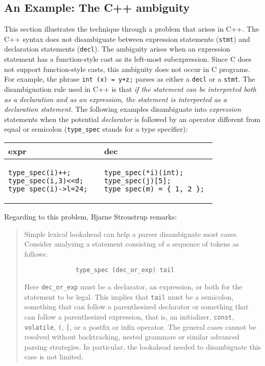 \label{section:amb}

\subsection{An Example: The C++ ambiguity}
This section illustrates the technique through a problem 
that arises in C++.
The C++ syntax \cite{c++} does not disambiguate between expression
statements (\verb|stmt|) and declaration statements (\verb|decl|). 
The ambiguity arises when an expression
statement has a function-style cast as its left-most subexpression.
Since C \cite{c} does not support function-style casts, this ambiguity does not occur
in C programs.
For example, the phrase \verb|int (x) = y+z;| 
parses as either a \texttt{decl} or a \texttt{stmt}.
The disambiguation rule used in C++ is that {\it
if the statement can be interpreted both as a declaration and
as an expression, the statement is interpreted as a declaration statement.
}
The following examples  disambiguate into {\it expression} statements when the
potential {\it declarator} is followed by an operator different from equal 
or semicolon (\texttt{type\_spec} stands for a type specifier):

\begin{center}
\begin{tabular}{|p{3.5cm}|p{4.5cm}|}
\hline
expr  & dec\\
\hline
\begin{verbatim}
type_spec(i)++;      
type_spec(i,3)<<d;  
type_spec(i)->l=24;
\end{verbatim}
&
\begin{verbatim}
type_spec(*i)(int); 
type_spec(j)[5];   
type_spec(m) = { 1, 2 }; 
\end{verbatim}\\
\hline
\end{tabular}
\end{center}

Regarding to this problem, Bjarne Stroustrup \cite{stroustrup} remarks:
\begin{quote}
\begin{it}
Simple lexical lookahead can help a parser disambiguate
most cases. Consider analyzing a statement consisting of
a sequence of tokens as follows:
\begin{verbatim}
              type_spec (dec_or_exp) tail
\end{verbatim}
Here \verb|dec_or_exp| must be a declarator, an expression, 
or both for the statement to be legal. This implies that \verb|tail|
must be a semicolon, something that can follow a 
parenthesized declarator or something that can follow
a parenthesized expression, that is, an initializer, \verb|const|,
\verb|volatile|, \verb|(|, \verb|[|, or a postfix or infix operator.
The general cases cannot be resolved without backtracking, nested grammars
or similar advanced parsing strategies. In particular,
the lookahead needed to disambiguate this case is not limited.
\end{it}
\end{quote}

